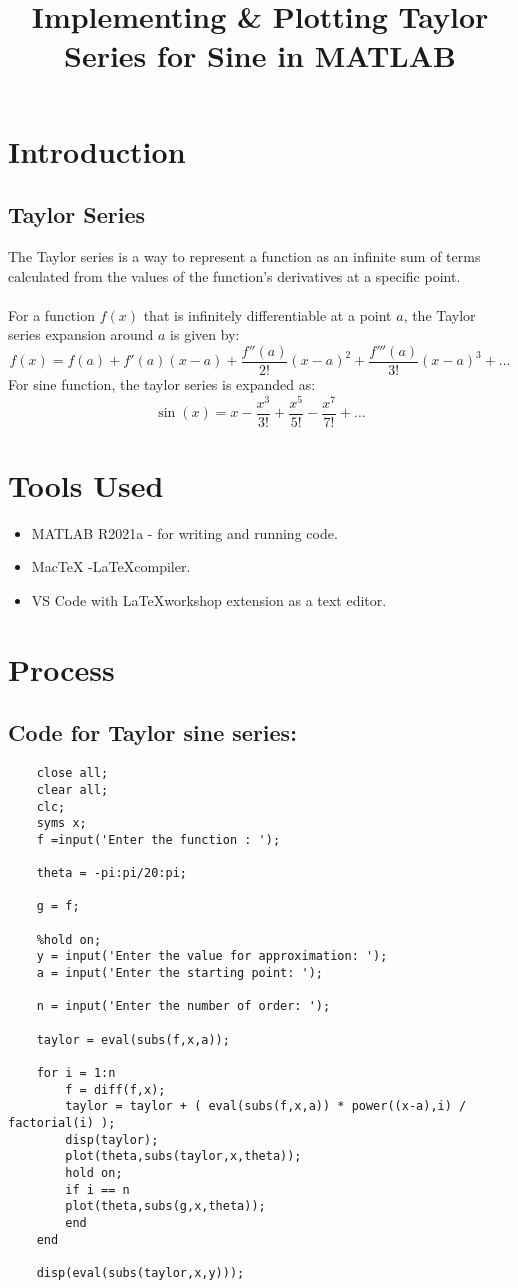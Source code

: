 \clearpage
\title{Implementing \& Plotting Taylor Series for Sine in MATLAB}
\author{}
\date{}
\maketitle

\section*{Introduction}
\subsection*{Taylor Series}
The Taylor series is a way to represent a function as an infinite sum of terms calculated from the values of the function's derivatives at a specific point.\\\\
For a function \(f(x)\) that is infinitely differentiable at a point \(a\), the Taylor series expansion around \(a\) is given by:
\[f(x) = f(a) + f'(a)(x-a) + \frac{f''(a)}{2!}(x-a)^2 + \frac{f'''(a)}{3!}(x-a)^3 + \ldots
\]
For sine function, the taylor series is expanded as:
\[\sin(x) = x - \frac{x^3}{3!} + \frac{x^5}{5!} - \frac{x^7}{7!} + \ldots\]

\section*{Tools Used}
\begin{itemize}
    \item MATLAB R2021a - for writing and running code.
    \item MacTeX -\LaTeX  compiler.
    \item VS Code with \LaTeX workshop extension as a text editor.
\end{itemize}

\section*{Process}
\subsection*{Code for Taylor sine series:}
\begin{verbatim}
    close all;
    clear all;
    clc;
    syms x;
    f =input('Enter the function : ');

    theta = -pi:pi/20:pi;

    g = f;

    %hold on;
    y = input('Enter the value for approximation: ');
    a = input('Enter the starting point: ');

    n = input('Enter the number of order: ');

    taylor = eval(subs(f,x,a));

    for i = 1:n
        f = diff(f,x);
        taylor = taylor + ( eval(subs(f,x,a)) * power((x-a),i) / factorial(i) );
        disp(taylor);
        plot(theta,subs(taylor,x,theta));
        hold on;
        if i == n
        plot(theta,subs(g,x,theta));
        end
    end

    disp(eval(subs(taylor,x,y)));
\end{verbatim}
